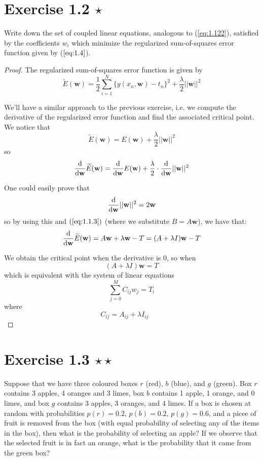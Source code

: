 \section*{Exercise 1.2 $\star$}
Write down the set of coupled linear equations, analogous to (\ref{eq:1.122}), satisfied
by the coefficients $w_i$ which minimize the regularized sum-of-squares error
function given by ($\ref{eq:1.4}$).
    
\vspace{1em}

\begin{proof}
    The regularized sum-of-squares error function is given by
    \begin{equation}\label{eq:1.4}\tag{1.4}
        \widetilde{E}(\mathbf{w}) = \frac{1}{2} \sum_{i = 1}^N 
            \{y(x_n, \mathbf{w}) - t_n\}^2 + \frac{\lambda}{2} ||\mathbf{w}||^2
    \end{equation}

    We'll have a similar approach to the previous exercise, i.e. we compute
    the derivative of the regularized error function and find the associated
    critical point. We notice that
    \[
        \widetilde{E}(\mathbf{w}) = E(\mathbf{w}) + \frac{\lambda}{2} ||\mathbf{w}||^2
    \] 
    so
    \[
        \dv{\mathbf{w}} \widetilde{E}(\mathbf{w}) 
        = \dv{\mathbf{w}} E(\mathbf{w}) + \frac{\lambda}{2} \cdot \dv{\mathbf{w}} ||\mathbf{w}||^2
    \] 

    One could easily prove that
    \[
        \dv{\mathbf{w}} ||\mathbf{w}||^2 = 2\mathbf{w}
    \] 
    so by using this and $(\ref{eq:1.1.3})$ (where we substitute $B = A\mathbf{w}$), we
    have that:
    \[
        \dv{\mathbf{w}} \widetilde{E}(\mathbf{w}) 
        = A\mathbf{w} + \lambda \mathbf{w} - T
        = (A + \lambda I)\mathbf{w} - T
    \] 

    We obtain the critical point when the derivative is 0, so when
    \[
        (A + \lambda I) \mathbf{w} = T
    \] 
    which is equivalent with the system of linear equations
    \[
        \sum_{j=0}^{M} C_{ij} w_j = T_i
    \] 
    where 
    \[
        C_{ij} = A_{ij} + \lambda I_{ij} \hspace{2em}
    \] 
\end{proof}

\section*{Exercise 1.3 $\star \star$}
Suppose that we have three coloured boxes $r$ (red), $b$ (blue), and $g$ (green). Box
$r$ contains 3 apples, 4 oranges and 3 limes, box $b$ contains 1 apple, 1 orange, and 0
limes, and box $g$ contains 3 apples, 3 oranges, and 4 limes. If a box is chosen
at random with probabilities $p(r) = 0.2$, $p(b) = 0.2$, $p(g) = 0.6$, and a picee 
of fruit is removed from the box (with equal probability of selecting any of the items
in the box), then what is the probability of selecting an apple? If we observe
that the selected fruit is in fact an orange, what is the probability that it came from
the green box?

